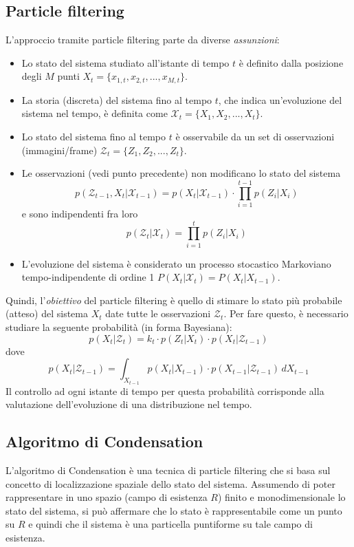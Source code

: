 \documentclass[a4paper,oneside,titlepage]{book}
\begin{document}
\subsection{Particle filtering}
L'approccio tramite particle filtering parte da diverse \textit{assunzioni}:
\begin{itemize}
    \item Lo stato del sistema studiato all'istante di tempo $t$ è definito dalla posizione degli $M$ punti $X_t = \{ x_{1,t}, x_{2,t}, ..., x_{M,t} \}$.
    \item La storia (discreta) del sistema fino al tempo $t$, che indica un'evoluzione del sistema nel tempo, è definita come $\mathcal{X}_t = \{ X_1, X_2, ..., X_t \}$.
    \item Lo stato del sistema fino al tempo $t$ è osservabile da un set di osservazioni (immagini/frame) $\mathcal{Z}_t = \{ Z_1, Z_2, ..., Z_t \}$.
    \item Le osservazioni (vedi punto precedente) non modificano lo stato del sistema
    \[ p(\mathcal{Z}_{t-1}, X_t | \mathcal{X}_{t-1}) = p(X_t | \mathcal{X}_{t-1}) \cdot \prod_{i=1}^{t-1} p(Z_i | X_i) \]
    e sono indipendenti fra loro
    \[ p(\mathcal{Z}_t | \mathcal{X}_t) = \prod_{i=1}^t p(Z_i | X_i) \]
    \item L'evoluzione del sistema è considerato un processo stocastico Markoviano tempo-indipendente di ordine 1 $P(X_t | \mathcal{X}_t) = P(X_t | X_{t-1})$.
\end{itemize}
Quindi, l'\textit{obiettivo} del particle filtering è quello di stimare lo stato più probabile (atteso) del sistema $X_t$ date tutte le osservazioni $\mathcal{Z}_t$. Per fare questo, è necessario studiare la seguente probabilità (in forma Bayesiana):
\[ p(X_t | \mathcal{Z}_t) = k_t \cdot p(Z_t | X_t) \cdot p(X_t | \mathcal{Z}_{t-1}) \]
dove
\[ p(X_t | \mathcal{Z}_{t-1}) = \int_{X_{t-1}} p(X_t | X_{t-1}) \cdot p(X_{t-1} | \mathcal{Z}_{t-1}) \, dX_{t-1} \]
Il controllo ad ogni istante di tempo per questa probabilità corrisponde alla valutazione dell'evoluzione di una distribuzione nel tempo.

\subsection{Algoritmo di Condensation}
L'algoritmo di Condensation è una tecnica di particle filtering che si basa sul concetto di localizzazione spaziale dello stato del sistema. Assumendo di poter rappresentare in uno spazio (campo di esistenza $R$) finito e monodimensionale lo stato del sistema, si può affermare che lo stato è rappresentabile come un punto su $R$ e quindi che il sistema è
una particella puntiforme su tale campo di esistenza.
\end{document}
